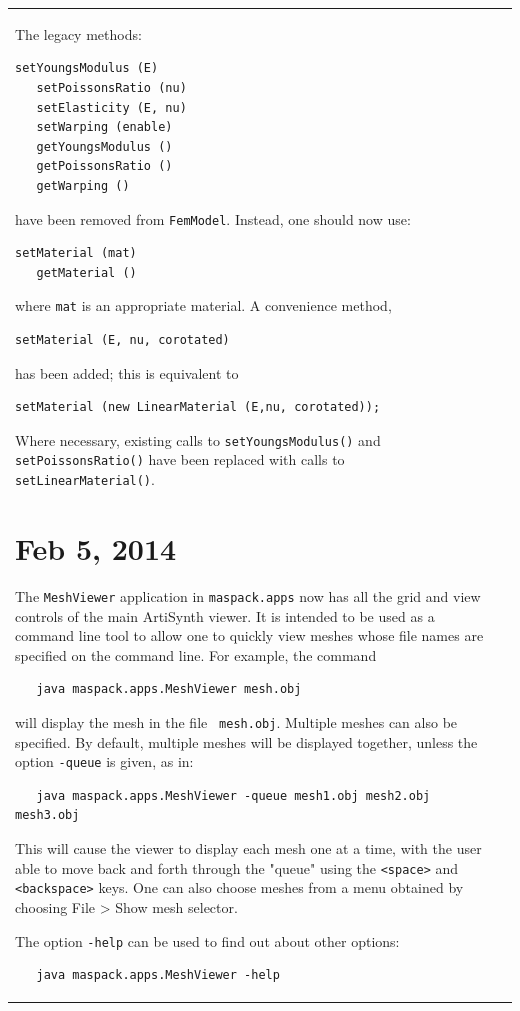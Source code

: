 \documentclass{article}
\begin{document}
\begin{tabular}{ll}
The legacy methods: 
\begin{lstlisting}[]
   setYoungsModulus (E)
   setPoissonsRatio (nu)
   setElasticity (E, nu)
   setWarping (enable)
   getYoungsModulus ()
   getPoissonsRatio ()
   getWarping ()
\end{lstlisting}
have been removed from {\tt FemModel}. Instead, one should now use:
\begin{lstlisting}[]
   setMaterial (mat)
   getMaterial ()
\end{lstlisting}
where {\tt mat} is an appropriate material.
A convenience method, 
\begin{lstlisting}[]
   setMaterial (E, nu, corotated)
\end{lstlisting}
has been added; this is equivalent to
\begin{lstlisting}[]
   setMaterial (new LinearMaterial (E,nu, corotated));
\end{lstlisting}

Where necessary, existing calls to {\tt setYoungsModulus()} and {\tt
setPoissonsRatio()} have been replaced with calls to {\tt
setLinearMaterial()}.

\section*{Feb 5, 2014}

The {\tt MeshViewer} application in {\tt maspack.apps} now has all the
grid and view controls of the main ArtiSynth viewer. It is intended to
be used as a command line tool to allow one to quickly view
meshes whose file names are specified on the command line.
For example, the command
\begin{verbatim}
   java maspack.apps.MeshViewer mesh.obj 
\end{verbatim}
will display the mesh in the file {\tt
mesh.obj}. Multiple meshes can also be specified. By default,
multiple meshes will be displayed together, 
unless the option {\tt -queue} is given, as in:
\begin{verbatim}
   java maspack.apps.MeshViewer -queue mesh1.obj mesh2.obj mesh3.obj 
\end{verbatim}
This will cause the viewer to display each mesh one at a time, with
the user able to move back and forth through the "queue" using the
{\tt <space>} and {\tt <backspace>} keys. One can also choose meshes
from a menu obtained by choosing {\sf File > Show mesh selector}.

The option {\tt -help} can be used to find out about other options:
\begin{verbatim}
   java maspack.apps.MeshViewer -help
\end{verbatim}


\end{tabular}
\end{document}
